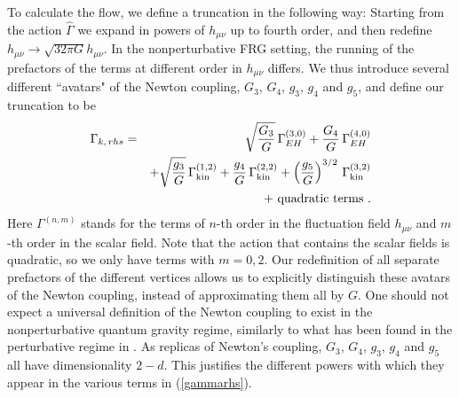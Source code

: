 \documentclass[11pt]{book} %
\newcommand{\bea}{\begin{eqnarray}}
\newcommand{\eea}{\end{eqnarray}}
\begin{document}
To calculate the flow, we define a truncation in the following way: Starting from the action $\hat{\Gamma}$ we expand in powers of $h_{\mu \nu}$ up to fourth order, and then redefine $h_{\mu \nu} \rightarrow \sqrt{32 \pi G} h_{\mu\nu}$. In the nonperturbative FRG setting, the running of the prefactors of the terms at different order in $h_{\mu \nu}$ differs. We thus introduce several different ``avatars" of the Newton coupling, $G_3$, $G_4$, $g_3$, $g_4$ and $g_5$, and define our truncation to be
\bea
\label{gammarhs}
\Gamma_{k, \, rhs}&=&  \sqrt{\frac{G_3}{G}} \, \Gamma_{EH}^{(3,0)} + \frac{G_4}{G} \, \Gamma_{EH}^{(4,0)}\nonumber\\
&{}& + \sqrt{\frac{g_3}{G}} \, \Gamma_{\rm kin}^{(1,2)} + \frac{g_4}{ G} \, \Gamma_{\rm kin}^{(2,2)} + \left(\frac{g_5}{ G}\right)^{3/2} \, \Gamma_{\rm kin}^{(3,2)}\nonumber\\
&{}& + \mbox{ quadratic terms }.
\eea
Here $\Gamma^{(n,m)}$ stands for the terms of $n$-th order in the fluctuation field $h_{\mu \nu}$
and $m$-th order in the scalar field.
Note that the action that contains the scalar fields is quadratic, so we only have terms with $m=0,2$.  Our redefinition of all separate prefactors of the different vertices allows us to explicitly distinguish these avatars of the Newton coupling, instead of approximating them all by $G$.  One should not expect a universal definition of the Newton coupling to exist in the nonperturbative quantum gravity regime, similarly to what has been found in the perturbative regime in \cite{Anber:2011ut}.
As replicas of Newton's coupling, $G_3$, $G_4$, $g_3$, $g_4$ and $g_5$ all have dimensionality $2-d$.
This justifies the different powers with which they appear
in the various terms in (\ref{gammarhs}).
\end{document}
